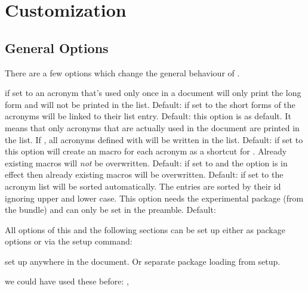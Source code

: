 \documentclass[DIV10,toc=index,toc=bib]{cnpkgdoc}
\begin{document}
\section{Customization}\label{sec:customization}
\subsection{General Options}
There are a few options which change the general behaviour of \acro.
\begin{beschreibung}
  if set to  an acronym that's
 used only once in a document will only print the long form and will not be
 printed in the list. Default: 
  if set to  the short forms
 of the acronyms will be linked to their list entry. Default: 
  this option is  as default.
 It means that only acronyms that are actually used in the document are printed
 in the list. If , all acronyms defined with  will
 be written in the list. Default: 
  if set to  this option will
 create an macro  for each acronym as a shortcut for .
 Already existing macros will \emph{not} be overwritten. Default: 
  if set to  and the option
  is in effect then already existing macros will be overwritten.
 Default: 
  if set to  the acronym list will
 be sorted automatically. The entries are sorted by their \acs{id} ignoring upper
 and lower case. This option needs the experimental package 
 (from the  bundle) and can only be set in the
 preamble. Default: 
\end{beschreibung}

All options of this and the following sections can be set up either as package
options or via the setup command:
\begin{beschreibung}
  set up \acro anywhere in the document. Or separate
 package loading from setup.
\end{beschreibung}

\begin{beispiel}
 we could have used these before: \nato, \ny
\end{beispiel}
\end{document}
